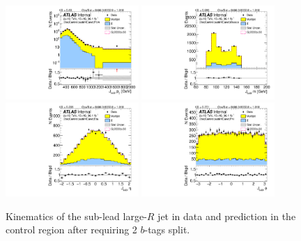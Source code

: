 \begin{figure}[htbp!]
\begin{center}
\includegraphics[width=0.45\textwidth,angle=-90]{figures/boosted/Control/b77_TwoTag_split_Control_sublHCand_Pt_m_1.pdf}
\includegraphics[width=0.45\textwidth,angle=-90]{figures/boosted/Control/b77_TwoTag_split_Control_sublHCand_Mass_s.pdf}\\
\includegraphics[width=0.45\textwidth,angle=-90]{figures/boosted/Control/b77_TwoTag_split_Control_sublHCand_Eta.pdf}
\includegraphics[width=0.45\textwidth,angle=-90]{figures/boosted/Control/b77_TwoTag_split_Control_sublHCand_Phi.pdf}
  \caption{Kinematics of the sub-lead large-$R$ jet in data and prediction in the control region after requiring 2 $b$-tags split. }
  \label{fig:boosted-2bs-control-ak10-subl}
\end{center}
\end{figure}

